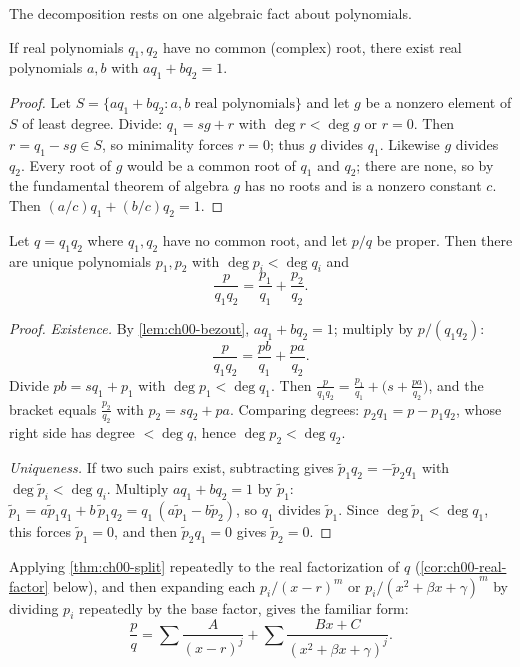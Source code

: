 The decomposition rests on one algebraic fact about polynomials.

\begin{lemma}\label{lem:ch00-bezout}
If real polynomials $q_1, q_2$ have no common (complex) root, there exist real
polynomials $a, b$ with $a q_1 + b q_2 = 1$.
\end{lemma}

\begin{proof}
Let $S = \{a q_1 + b q_2 : a, b \text{ real polynomials}\}$ and let $g$ be a
nonzero element of $S$ of least degree. Divide: $q_1 = s g + r$ with
$\deg r < \deg g$ or $r=0$. Then $r = q_1 - s g\in S$, so minimality forces
$r=0$; thus $g$ divides $q_1$. Likewise $g$ divides $q_2$. Every root of $g$
would be a common root of $q_1$ and $q_2$; there are none, so by the
fundamental theorem of algebra $g$ has no roots and is a nonzero constant $c$.
Then $(a/c)q_1 + (b/c)q_2 = 1$.
\end{proof}

\begin{theorem}\label{thm:ch00-split}
Let $q = q_1 q_2$ where $q_1, q_2$ have no common root, and let $p/q$ be
proper. Then there are unique polynomials $p_1, p_2$ with
$\deg p_i < \deg q_i$ and
\[
  \frac{p}{q_1 q_2} = \frac{p_1}{q_1} + \frac{p_2}{q_2}.
\]
\end{theorem}

\begin{proof}
\emph{Existence.} By \cref{lem:ch00-bezout}, $a q_1 + b q_2 = 1$; multiply by
$p/(q_1q_2)$:
\[
  \frac{p}{q_1 q_2} = \frac{pb}{q_1} + \frac{pa}{q_2}.
\]
Divide $pb = s q_1 + p_1$ with $\deg p_1 < \deg q_1$. Then
$\frac{p}{q_1q_2} = \frac{p_1}{q_1} + \bigl(s + \frac{pa}{q_2}\bigr)$, and the
bracket equals $\frac{p_2}{q_2}$ with $p_2 = s q_2 + pa$. Comparing degrees:
$p_2 q_1 = p - p_1 q_2$, whose right side has degree $<\deg q$, hence
$\deg p_2 < \deg q_2$.

\emph{Uniqueness.} If two such pairs exist, subtracting gives
$\tilde p_1 q_2 = -\tilde p_2 q_1$ with $\deg\tilde p_i < \deg q_i$. Multiply
$a q_1 + b q_2 = 1$ by $\tilde p_1$:
$\tilde p_1 = a\tilde p_1 q_1 + b\,\tilde p_1 q_2 = q_1\,(a\tilde p_1 - b\tilde p_2)$,
so $q_1$ divides $\tilde p_1$. Since $\deg\tilde p_1 < \deg q_1$, this forces
$\tilde p_1 = 0$, and then $\tilde p_2 q_1 = 0$ gives $\tilde p_2=0$.
\end{proof}

Applying \cref{thm:ch00-split} repeatedly to the real factorization of $q$
(\cref{cor:ch00-real-factor} below), and then expanding each
$p_i/(x-r)^m$ or $p_i/(x^2+\beta x+\gamma)^m$ by dividing $p_i$ repeatedly by
the base factor, gives the familiar form:
\[
  \frac{p}{q} = \sum \frac{A}{(x-r)^j}
              + \sum \frac{Bx + C}{(x^2+\beta x+\gamma)^j}.
\]

